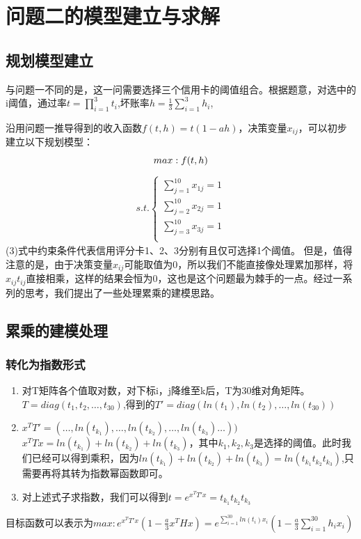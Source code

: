 \documentclass{MathorCupmodeling}
\begin{document}
 	\section{问题二的模型建立与求解}
  \subsection{规划模型建立}
  与问题一不同的是，这一问需要选择三个信用卡的阈值组合。根据题意，对选中的i阈值，通过率$t=\prod_{i=1}^{3}t_{i}$,坏账率$h=\frac{1}{3}\sum_{i=1}^{3}h_{i}$,
  
  沿用问题一推导得到的收入函数$f(t,h)=t(1-ah) $，决策变量$x_{ij}$，可以初步建立以下规划模型：
  $$
max: f(t,h) \\
$$
\begin{gather}
s.t.
\left\{
\begin{aligned}
\sum_{j=1}^{10}x_{1j} =1   \\
\sum_{j=2}^{10}x_{2j} =1   \\
\sum_{j=3}^{10}x_{3j} =1 \\
\end{aligned}
\right.
\end{gather} 
(3)式中约束条件代表信用评分卡1、2、3分别有且仅可选择1个阈值。
但是，值得注意的是，由于决策变量$x_{ij}$可能取值为0，所以我们不能直接像处理累加那样，将$x_{ij}t_{ij}$直接相乘，这样的结果会恒为0，这也是这个问题最为棘手的一点。经过一系列的思考，我们提出了一些处理累乘的建模思路。
\subsection{累乘的建模处理}
\subsubsection{转化为指数形式}
\begin{enumerate}
    \item 对T矩阵各个值取对数，对下标i，j降维至k后，T为30维对角矩阵。
        $T=diag(t_{1},t_{2},\dots,t_{30})$,得到的$T' = diag(ln(t_{1}),ln(t_{2}),\dots,ln(t_{30}))$
    \item $x^{T}T'=(\dots,ln(t_{k_{1}}),\dots,ln(t_{k_{2}}),\dots,ln(t_{k_{3}})\dots))$\\
    $x^{T}Tx =ln(t_{k_{1}})+ln(t_{k_{2}})+ln(t_{k_{3}})$，其中$k_{1},k_{2},k_{3}$是选择的阈值。此时我们已经可以得到乘积，因为$ln(t_{k_{1}})+ln(t_{k_{2}})+ln(t_{k_{3}})=ln(t_{k_{1}}t_{k_{2}}t_{k_{3}})$,只需要再将其转为指数幂函数即可。
    \item 对上述式子求指数，我们可以得到$t=e^{x^{T}T'x}=t_{k_{1}}t_{k_{2}}t_{k_{3}}$
\end{enumerate}
目标函数可以表示为$max:e^{x^{T}T'x}(1-\frac{a}{3}x^{T}Hx)=e^{\sum_{i=1}^{30}ln(t_{i})x_{i}}(1-\frac{a}{3}\sum_{i=1}^{30}h_{i}x_{i})$
\end{document}
